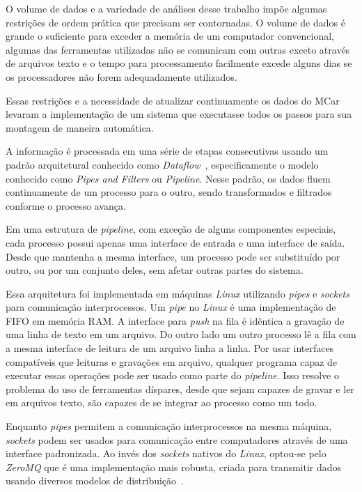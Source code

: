 \documentclass[12pt,a4paper]{article}
\theoremstyle{hypo}
\begin{document}
O volume de dados e a variedade de análises desse trabalho impõe algumas restrições de ordem prática que precisam ser contornadas. O volume de dados é grande o suficiente para exceder a memória de um computador convencional, algumas das ferramentas utilizadas não se comunicam com outras exceto através de arquivos texto e o tempo para processamento facilmente excede alguns dias se os processadores não forem adequadamente utilizados.

Essas restrições e a necessidade de atualizar continuamente os dados do MCar levaram a implementação de um sistema que executasse todos os passos para sua montagem de maneira automática.

A informação é processada em uma série de etapas consecutivas usando um padrão arquitetural conhecido como \textit{Dataflow}~\cite{Carkci2014-jk, Hohpe2003-nj}, especificamente o modelo conhecido como \textit{Pipes and Filters} ou \textit{Pipeline}. Nesse padrão, os dados fluem continuamente de um processo para o outro, sendo transformados e filtrados conforme o processo avança. 

Em uma estrutura de \textit{pipeline}, com exceção de alguns componentes especiais, cada processo possui apenas uma interface de entrada e uma interface de saída. Desde que mantenha a mesma interface, um processo pode ser substituído por outro, ou por um conjunto deles, sem afetar outras partes do sistema.

Essa arquitetura foi implementada em máquinas \textit{Linux} utilizando \textit{pipes} e \textit{sockets} para comunicação interprocessos. Um \textit{pipe} no \textit{Linux} é uma implementação de FIFO em memória RAM. A interface para \textit{push} na fila é idêntica a gravação de uma linha de texto em um arquivo. Do outro lado um outro processo lê a fila com a mesma interface de leitura de um arquivo linha a linha. Por usar interfaces compatíveis que leituras e gravações em arquivo, qualquer programa capaz de executar essas operações pode ser usado como parte do \textit{pipeline}. Isso resolve o problema do uso de ferramentas díspares, desde que sejam capazes de gravar e ler em arquivos texto, são capazes de se integrar ao processo como um todo.

Enquanto \textit{pipes} permitem a comunicação interprocessos na mesma máquina, \textit{sockets} podem ser usados para comunicação entre computadores através de uma interface padronizada. Ao invés dos \textit{sockets} nativos do \textit{Linux}, optou-se pelo \textit{ZeroMQ} que é uma implementação mais robusta, criada para transmitir dados usando diversos modelos de distribuição~\cite{Hintjens2013-tz}.
\end{document}
